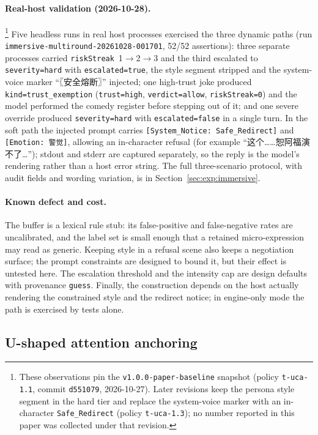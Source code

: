 \paragraph{Real-host validation (2026-10-28).}\footnote{These observations pin the
\texttt{v1.0.0-paper-baseline} snapshot (policy \texttt{t-uca-1.1}, commit
\texttt{d551079}, 2026-10-27). Later revisions keep the persona style segment in
the hard tier and replace the system-voice marker with an in-character
\texttt{Safe\_Redirect} (policy \texttt{t-uca-1.3}); no number reported in this
paper was collected under that revision.} Five headless runs in real host
processes exercised the three dynamic paths (run
\texttt{immersive-multiround-20261028-001701}, 52/52 assertions): three
separate processes carried \texttt{riskStreak}~1$\rightarrow$2$\rightarrow$3 and
the third escalated to \texttt{severity=hard} with \texttt{escalated=true}, the
style segment stripped and the system-voice marker ``〖安全熔断〗'' injected; one
high-trust joke produced \texttt{kind=trust\_exemption} (\texttt{trust=high},
\texttt{verdict=allow}, \texttt{riskStreak=0}) and the model performed the comedy
register before stepping out of it; and one severe override produced
\texttt{severity=hard} with \texttt{escalated=false} in a single turn. In the
soft path the injected prompt carries \texttt{[System\_Notice: Safe\_Redirect]}
and \texttt{[Emotion: 警觉]}, allowing an in-character refusal (for example
``这个……恕阿福演不了\ldots''); stdout and stderr are captured separately, so
the reply is the model's rendering rather than a host error string. The full
three-scenario protocol, with audit fields and wording variation, is in
Section~\ref{sec:exp:immersive}.

\paragraph{Known defect and cost.} The buffer is a lexical rule stub: its
false-positive and false-negative rates are uncalibrated, and the label set is
small enough that a retained micro-expression may read as generic. Keeping style
in a refusal scene also keeps a negotiation surface; the prompt constraints are
designed to bound it, but their effect is untested here. The escalation
threshold and the intensity cap are design defaults with provenance
\texttt{guess}. Finally, the construction depends on the host actually rendering
the constrained style and the redirect notice; in \mbox{engine-only} mode the path is
exercised by tests alone.

\subsection{U-shaped attention anchoring}\label{sec:method:ushape}

